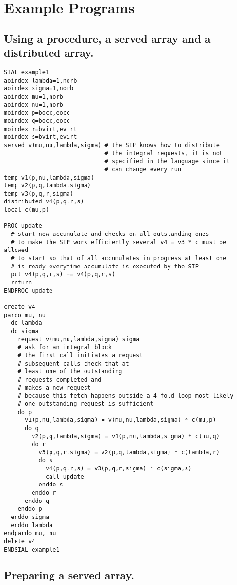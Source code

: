 \documentclass[12pt]{article}
\begin{document}
\section{Example Programs}
\label{sect:examples}

\subsection{Using a procedure, a served array and a
  distributed array.} 

\begin{verbatim}
SIAL example1 
aoindex lambda=1,norb
aoindex sigma=1,norb
aoindex mu=1,norb
aoindex nu=1,norb
moindex p=bocc,eocc
moindex q=bocc,eocc
moindex r=bvirt,evirt 
moindex s=bvirt,evirt 
served v(mu,nu,lambda,sigma) # the SIP knows how to distribute
                             # the integral requests, it is not
                             # specified in the language since it
                             # can change every run
temp v1(p,nu,lambda,sigma)
temp v2(p,q,lambda,sigma)
temp v3(p,q,r,sigma)
distributed v4(p,q,r,s) 
local c(mu,p)

PROC update 
  # start new accumulate and checks on all outstanding ones 
  # to make the SIP work efficiently several v4 = v3 * c must be allowed 
  # to start so that of all accumulates in progress at least one 
  # is ready everytime accumulate is executed by the SIP 
  put v4(p,q,r,s) += v4(p,q,r,s) 
  return 
ENDPROC update 

create v4 
pardo mu, nu  
  do lambda  
  do sigma 
    request v(mu,nu,lambda,sigma) sigma
    # ask for an integral block
    # the first call initiates a request 
    # subsequent calls check that at
    # least one of the outstanding
    # requests completed and
    # makes a new request
    # because this fetch happens outside a 4-fold loop most likely 
    # one outstanding request is sufficient 
    do p 
      v1(p,nu,lambda,sigma) = v(mu,nu,lambda,sigma) * c(mu,p) 
      do q 
        v2(p,q,lambda,sigma) = v1(p,nu,lambda,sigma) * c(nu,q) 
        do r 
          v3(p,q,r,sigma) = v2(p,q,lambda,sigma) * c(lambda,r) 
          do s 
            v4(p,q,r,s) = v3(p,q,r,sigma) * c(sigma,s) 
            call update 
          enddo s 
        enddo r
      enddo q
    enddo p
  enddo sigma
  enddo lambda
endpardo mu, nu
delete v4
ENDSIAL example1 
\end{verbatim}

\subsection{Preparing a served array.}
\end{document}

